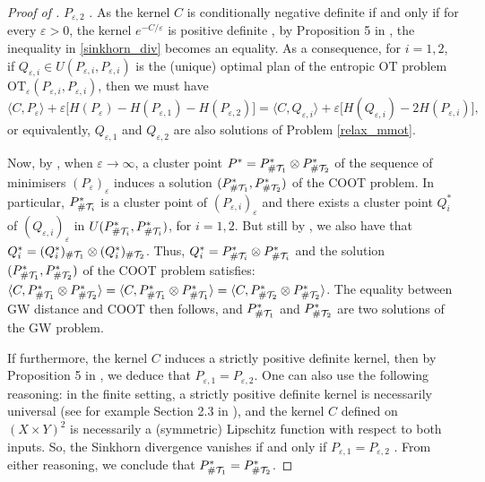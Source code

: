 \begin{proof}[Proof of ]
$P_{\varepsilon, 2}$ \citep{Ramdas17}. As the kernel $C$ is conditionally negative definite if and only if for every
$\varepsilon > 0$, the kernel $e^{-C / \varepsilon}$ is positive definite \citep{Schoenberg38}, by Proposition 5 in \citep{Janati20},
the inequality in \ref{sinkhorn_div} becomes an equality. As a consequence, for $i=1,2$, if
$Q_{\varepsilon, i} \in U( P_{\varepsilon, i}, P_{\varepsilon, i})$ is the (unique) optimal plan of the entropic OT problem
$\text{OT}_{\varepsilon}(P_{\varepsilon, i}, P_{\varepsilon, i})$, then we must have
\begin{equation}
  \langle C, P_{\varepsilon} \rangle + \varepsilon \big[ H(P_{\varepsilon}) - H(P_{\varepsilon, 1}) -
  H(P_{\varepsilon, 2}) \big] =
  \langle C, Q_{\varepsilon, i} \rangle + \varepsilon \big[ H(Q_{\varepsilon, i}) - 2 H(P_{\varepsilon, i}) \big],
\end{equation}
or equivalently, $Q_{\varepsilon, 1}$ and $Q_{\varepsilon, 2}$ are also solutions of Problem \eqref{relax_mmot}.

Now, by , when $\varepsilon \to \infty$, a cluster point
$P^* = P^*_{\# \mathcal T_1} \otimes P^*_{\# \mathcal T_2}$ of the sequence of minimisers $(P_{\varepsilon})_{\varepsilon}$ induces a solution
$(P^*_{\# \mathcal T_1}, P^*_{\# \mathcal T_2})$ of the COOT problem. In particular, $P^*_{\# \mathcal T_i}$ is a cluster point of
$(P_{\varepsilon, i})_{\varepsilon}$ and there exists a cluster point $Q^*_i$ of
$(Q_{\varepsilon, i})_{\varepsilon}$ in $U(P^*_{\# \mathcal T_i}, P^*_{\# \mathcal T_i})$, for $i=1,2$. But still by
, we also have that $Q^*_i = (Q^*_i)_{\# \mathcal T_1} \otimes (Q^*_i)_{\# \mathcal T_2}$. Thus,
$Q^*_i = P^*_{\# \mathcal T_i} \otimes P^*_{\# \mathcal T_i}$
and the solution $(P^*_{\# \mathcal T_1}, P^*_{\# \mathcal T_2})$ of the COOT problem satisfies:
$\langle C, P^*_{\# \mathcal T_1} \otimes P^*_{\# \mathcal T_2} \rangle =
\langle C, P^*_{\# \mathcal T_1} \otimes P^*_{\# \mathcal T_1} \rangle =
\langle C, P^*_{\# \mathcal T_2} \otimes P^*_{\# \mathcal T_2} \rangle$. The equality between GW distance and COOT then follows,
and $P^*_{\# \mathcal T_1}$ and $P^*_{\# \mathcal T_2}$ are two solutions of the GW problem.

If furthermore, the kernel $C$ induces a strictly positive definite kernel, then by Proposition 5 in \citep{Janati20},
we deduce that $P_{\varepsilon, 1} = P_{\varepsilon, 2}$. One can also use the following reasoning:
in the finite setting, a strictly positive definite kernel is necessarily universal (see for example Section 2.3 in
\citep{Borgwardt06}), and the kernel $C$ defined on $(X \times Y)^2$ is necessarily a (symmetric)
Lipschitz function with respect to both inputs. So, the Sinkhorn divergence vanishes if and only if
$P_{\varepsilon, 1} = P_{\varepsilon, 2}$ \citep{Feydy19}. From either reasoning, we conclude that
$P^*_{\# \mathcal T_1} = P^*_{\# \mathcal T_2}$.
\end{proof}